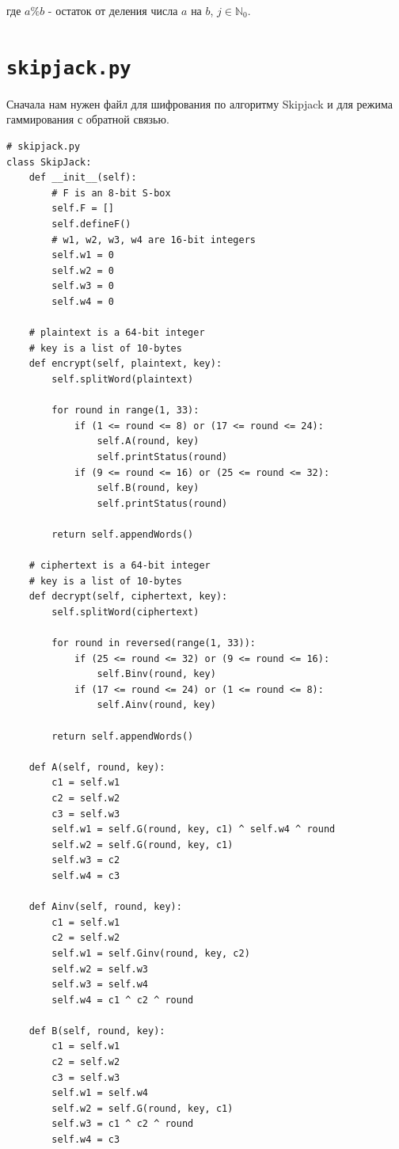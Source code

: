 \documentclass{article}
\begin{document}
\noindent где $a \% b$ - остаток от деления числа $a$ на $b$, $j \in \mathbb{N}_0$.

\section{\texttt{skipjack.py}}

Сначала нам нужен файл для шифрования по алгоритму Skipjack и для режима гаммирования с обратной связью.

\begin{verbatim}
# skipjack.py
class SkipJack:
    def __init__(self):
        # F is an 8-bit S-box
        self.F = []
        self.defineF()
        # w1, w2, w3, w4 are 16-bit integers
        self.w1 = 0
        self.w2 = 0
        self.w3 = 0
        self.w4 = 0

    # plaintext is a 64-bit integer
    # key is a list of 10-bytes
    def encrypt(self, plaintext, key):
        self.splitWord(plaintext)

        for round in range(1, 33):
            if (1 <= round <= 8) or (17 <= round <= 24):
                self.A(round, key)
                self.printStatus(round)
            if (9 <= round <= 16) or (25 <= round <= 32):
                self.B(round, key)
                self.printStatus(round)

        return self.appendWords()

    # ciphertext is a 64-bit integer
    # key is a list of 10-bytes
    def decrypt(self, ciphertext, key):
        self.splitWord(ciphertext)

        for round in reversed(range(1, 33)):
            if (25 <= round <= 32) or (9 <= round <= 16):
                self.Binv(round, key)
            if (17 <= round <= 24) or (1 <= round <= 8):
                self.Ainv(round, key)

        return self.appendWords()

    def A(self, round, key):
        c1 = self.w1
        c2 = self.w2
        c3 = self.w3
        self.w1 = self.G(round, key, c1) ^ self.w4 ^ round
        self.w2 = self.G(round, key, c1)
        self.w3 = c2
        self.w4 = c3

    def Ainv(self, round, key):
        c1 = self.w1
        c2 = self.w2
        self.w1 = self.Ginv(round, key, c2)
        self.w2 = self.w3
        self.w3 = self.w4
        self.w4 = c1 ^ c2 ^ round

    def B(self, round, key):
        c1 = self.w1
        c2 = self.w2
        c3 = self.w3
        self.w1 = self.w4
        self.w2 = self.G(round, key, c1)
        self.w3 = c1 ^ c2 ^ round
        self.w4 = c3


\end{verbatim}
\end{document}

